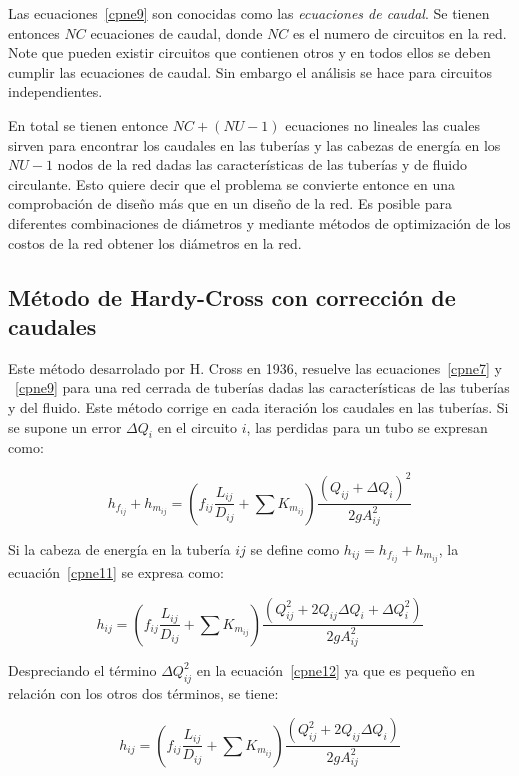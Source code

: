 \documentclass[11pt, oneside]{article}
\begin{document}
Las ecuaciones~\ref{cpne9} son conocidas como las \emph{ecuaciones de caudal}. Se tienen entonces $NC$ ecuaciones de caudal, donde $NC$ es el numero de circuitos en la red. Note que pueden existir circuitos que contienen otros y en todos ellos se deben cumplir las ecuaciones de caudal. Sin embargo el an\'alisis se hace para circuitos independientes.

En total se tienen entonce $NC+(NU-1)$ ecuaciones no lineales las cuales sirven para encontrar los caudales en las tuber\'ias y las cabezas de energ\'ia en los $NU-1$ nodos de la red dadas las caracter\'isticas de las tuber\'ias y de fluido circulante. Esto quiere decir que el problema se convierte entonce en una comprobaci\'on de dise\~no m\'as que en un dise\~no de la red. Es posible para diferentes combinaciones de di\'ametros y mediante m\'etodos de optimizaci\'on de los costos de la red obtener los di\'ametros en la red.

\subsection{M\'etodo de Hardy-Cross con correcci\'on de caudales}
Este m\'etodo desarrolado por H. Cross en 1936, resuelve las ecuaciones~\ref{cpne7} y ~\ref{cpne9} para una red cerrada de tuber\'ias dadas las caracter\'isticas de las tuber\'ias y del fluido. Este m\'etodo corrige en cada iteraci\'on los caudales en las tuber\'ias. Si se supone un error $\Delta Q_i$ en el circuito $i$, las perdidas para un tubo se expresan como:

\begin{equation}
h_{f_{ij}} + h_{m_{ij}} = \left( f_{ij} \frac{L_{ij}}{D_{ij}}+ \sum K_{m_{ij}} \right) \frac{(Q_{ij}+\Delta Q_i)^2}{2gA_{ij}^2}
\label{cpne11}
\end{equation}

Si la cabeza de energ\'ia en la tuber\'ia $ij$ se define como $h_{ij}=h_{f_{ij}} + h_{m_{ij}}$, la ecuaci\'on~\ref{cpne11} se expresa como:

\begin{equation}
h_{ij} = \left( f_{ij} \frac{L_{ij}}{D_{ij}} + \sum K_{m_{ij}} \right) \frac{(Q_{ij}^2 + 2Q_{ij}\Delta Q_i + \Delta Q_i^2)}{2gA_{ij}^2}
\label{cpne12}
\end{equation}

Despreciando el t\'ermino $\Delta Q_{ij}^2$ en la ecuaci\'on~\ref{cpne12} ya que es peque\~no en relaci\'on con los otros dos t\'erminos, se tiene:

\begin{equation}
h_{ij} = \left( f_{ij} \frac{L_{ij}}{D_{ij}}+ \sum K_{m_{ij}} \right) \frac{(Q_{ij}^2 + 2Q_{ij}\Delta Q_i)}{2gA_{ij}^2}
\label{cpne13}
\end{equation}
\end{document}
